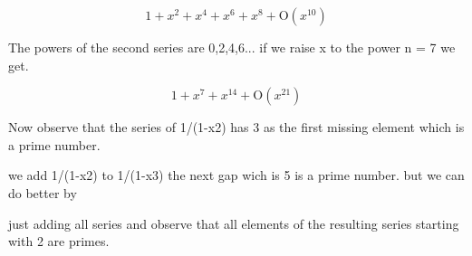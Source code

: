 \documentclass{article}
\begin{document}
\begin{maplegroup}
\begin{mapleinput}
\end{mapleinput}

\mapleresult
\begin{maplelatex}
\[
1 + x^{2} + x^{4} + x^{6} + x^{8} + \mathrm{O}(x^{10})
\]
\end{maplelatex}

\end{maplegroup}
\begin{maplegroup}
The powers of the second series are 0,2,4,6... if we raise x to the
power n = 7  we get.

\end{maplegroup}
\begin{maplegroup}
\begin{mapleinput}
\end{mapleinput}

\mapleresult
\begin{maplelatex}
\[
1 + x^{7} + x^{14} + \mathrm{O}(x^{21})
\]
\end{maplelatex}

\end{maplegroup}
\begin{maplegroup}
Now observe that the series of 1/(1-x2) has 3 as the first
missing element which is a prime number.

we add 1/(1-x2) to 1/(1-x3) the next gap wich is
5 is a prime number. but we can do better by 

just adding all series and observe that all elements of the resulting
series starting with 2 are primes.

\end{maplegroup}
\end{document}
